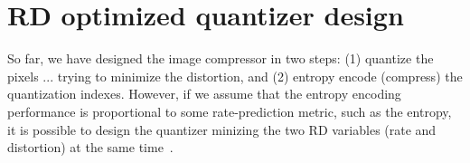 \begin{comment}
\section{Comparison}
As you can see (run
\href{https://github.com/Sistemas-Multimedia/Sistemas-Multimedia.github.io/blob/master/contents/gray_SQ/compare_quantizers.ipynb}{compare\_quantizers.ipynb}),
the way in which the signal is quantized affects the RD performance,
and this fact holds for all the quantizers, and in general, the better
quantizer is the Lloyd-Max quantizer because it adapts the QSSs
(Quantization Step Sizes) to the
\href{https://en.wikipedia.org/wiki/Histogram}{histogram}\footnote{Or
\href{https://en.wikipedia.org/wiki/Probability_density_function}{PDF
  (Probability Density Function)} in the case of a continuous signal.}
of the image. However, notice also that, since the QSSs depend on the
pixel intensities distribution of the image, such distribution or the correspondence between the
quantization indexes and the corresponding representation levels (the
``pallete'') must be also ``transmitted'' to the decoder, which
decreases the final RD performance.

-------- Notice also the remarkable perormance of the DeadZone Quantizer (DZQ)
at low bit-rates. This is one of the reasons why the DZQ is used in
several standard image and video codecs (such as JPEG 2000 and
H.264). Another reason is that, when the QSSs are powers of two, we
can use an
\href{https://en.wikipedia.org/wiki/Bit_plane}{bit-plane}-based
entropy encoder. -----------

Finally, notice that (you must see the notebooks) when the QSSs are
powers of 2, the points of the RD curve tend to belong to the convex
hull of the RD curve. On the contrary, if the QSSs can be any, the RD
curves can have points for bit-rates $i$ and $i+1$ where the condition
$\lambda_i\ge\lambda_{i+1}$ (being $\lambda_i$ the slope of the RD
curve at the bit-rate $i$) is not satisfied, which can difficult the
(bit-)rate control.
\end{comment}

\section{RD optimized quantizer design}
So far, we have designed the image compressor in two steps: (1)
quantize the pixels ... trying to minimize the distortion, and (2) entropy
encode (compress) the quantization indexes. However, if we assume that
the entropy encoding performance is proportional to some
rate-prediction metric, such as the entropy, it is possible to design
the quantizer minizing the two RD variables (rate and distortion) at
the same time~\cite{sayood2017introduction}.

